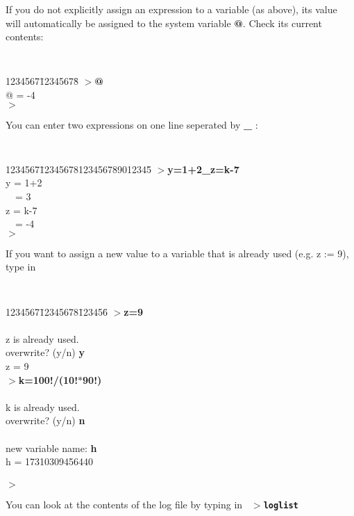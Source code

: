 If you do not explicitly assign an expression to a variable
(as above), its value will automatically be assigned
to the system variable {\bf @}. Check its current contents:
\leer
{\tt
  \begin{tabbing}
  1234567\=12345678\=\kill
  $>${\bf @}\ \ \care\\
  \> @ = -4\\
  $>$
  \end{tabbing}
}
\newpage
You can enter two expressions on one line seperated by {\bf \_} :
\leer
{\tt
  \begin{tabbing}
  1234567\=12345678123456789012345\=\kill
  $>${\bf y=1+2\_z=k-7}\ \ \care
  \> \\
  \> y = 1+2\\
  \>\ \ = 3
  \> \\
  \> z = k-7\\
  \> \ \ = -4\\
  $>$
  \end{tabbing}
}
\leer
If you want to assign a new value to a variable that is already used (e.g.\/ z := 9),
type in
\leer
{\tt
  \begin{tabbing}
  1234567\=12345678\=123456\=\kill
  $>${\bf z=9} \care \>\\
  \> \>\\
  z is already used. \>\\
  overwrite? (y/n) {\bf  y}\ \ \care \>\\
  \> z = 9 \>\\
  $>${\bf k=100!/(10!$*$90!)}\ \ \care \>\\
  \> \>\\
  k is already used. \>\\
  overwrite? (y/n) {\bf n}\ \ \care\\
  \> \>\\
  new variable name: {\bf h}\ \ \care \>\\
  \> h = 17310309456440 \>\\
  \> \>\\
  $>$ \>
  \end{tabbing}
}
\leer
You can look at the contents of the log file by typing in
\leer
{\tt
  $>${\bf loglist} \care
}

\newpage

